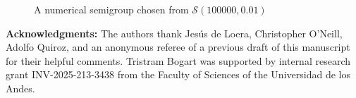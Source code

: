 \documentclass[11pt]{amsart}
\theoremstyle{definition}
\theoremstyle{remark}
\def\nsg{\ensuremath{\mathcal{S}}}
\begin{document}
\begin{figure}[ht]
        \begin{center}
            \scalebox{0.6}{}
        \end{center}
        \caption{A numerical semigroup chosen from $\nsg(100000, 0.01)$}
\end{figure}





\textbf{Acknowledgments:} The authors thank Jes\'us de Loera, Christopher O'Neill, Adolfo Quiroz, and an anonymous referee of a previous draft of this manuscript for their helpful comments. Tristram Bogart was supported by internal research grant INV-2025-213-3438 from the Faculty of Sciences of the Universidad de los Andes.  




\end{document}

